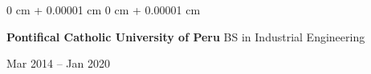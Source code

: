 \documentclass[10pt, letterpaper]{article}
\newenvironment{highlights}{
    \begin{itemize}[
        topsep=0.10 cm,
        parsep=0.10 cm,
        partopsep=0pt,
        itemsep=0pt,
        leftmargin=0 cm + 10pt
    ]
}{
    \end{itemize}
} %
\newenvironment{onecolentry}{
    \begin{adjustwidth}{
        0 cm + 0.00001 cm
    }{
        0 cm + 0.00001 cm
    }
}{
    \end{adjustwidth}
} %
\newenvironment{twocolentry}[2][]{
    \onecolentry
    \def\secondColumn{#2}
    \setcolumnwidth{\fill, 4.5 cm}
    \begin{paracol}{2}
}{
    \switchcolumn \raggedleft \secondColumn
    \end{paracol}
    \endonecolentry
} %
\begin{document}
\begin{twocolentry}{Mar 2014 – Jan 2020}
    \textbf{Pontifical Catholic University of Peru} \textbar BS in Industrial Engineering
\end{twocolentry}








        




    



        

\end{document}

